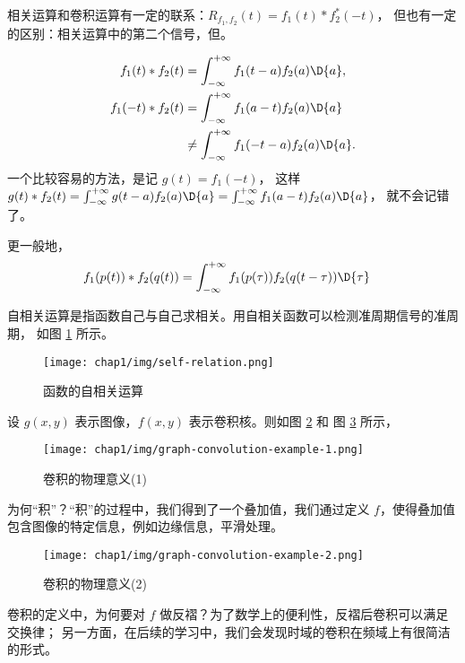 \begin{remark}
    相关运算和卷积运算有一定的联系：$R_{f_1, f_2}(t) = f_1(t) * f_2^*(-t)$，
    但也有一定的区别：相关运算中的第二个信号，但。
\end{remark}

\begin{note}
    \begin{align*}
        f_1(t) * f_2(t) & = \int_{-\infty}^{+\infty}f_1(t - a)f_2(a)\D{a}, \\
        f_1(-t) * f_2(t) & = \int_{-\infty}^{+\infty}f_1(a - t)f_2(a)\D{a} \\
        & \neq \int_{-\infty}^{+\infty}f_1(-t - a)f_2(a)\D{a}.
    \end{align*}
    一个比较容易的方法，是记 $g(t) = f_1(-t)$，
    这样 $g(t) * f_2(t) = \int_{-\infty}^{+\infty}g(t - a)f_2(a)\D{a} = \int_{-\infty}^{+\infty}f_1(a - t)f_2(a)\D{a}$，
    就不会记错了。

    更一般地，
    \begin{align*}
        f_1(p(t)) * f_2(q(t)) & = \int_{-\infty}^{+\infty}f_1(p(\tau))f_2(q(t-\tau))\D{\tau}
    \end{align*}
\end{note}

\begin{example}[自相关运算]
    自相关运算是指函数自己与自己求相关。用自相关函数可以检测准周期信号的准周期，
    如图 \ref{fig:self-relation} 所示。
    \begin{figure}[H]
        \centering
        \texttt{[image: chap1/img/self-relation.png]}
        \caption{函数的自相关运算}
        \label{fig:self-relation}
    \end{figure}
\end{example}

\begin{example}[卷积的物理意义]
    设 $g(x, y)$ 表示图像，$f(x, y)$ 表示卷积核。则如图 \ref{fig:graph-convolution-example-1} 和
    图 \ref{fig:graph-convolution-example-2} 所示，
    \begin{figure}[H]
        \centering
        \texttt{[image: chap1/img/graph-convolution-example-1.png]}
        \caption{卷积的物理意义(1)}
        \label{fig:graph-convolution-example-1}
    \end{figure}
    为何``积''？``积''的过程中，我们得到了一个叠加值，我们通过定义 $f$，使得叠加值包含图像的特定信息，例如边缘信息，平滑处理。
    \begin{figure}[H]
        \centering
        \texttt{[image: chap1/img/graph-convolution-example-2.png]}
        \caption{卷积的物理意义(2)}
        \label{fig:graph-convolution-example-2}
    \end{figure}
\end{example}

\begin{note}
    卷积的定义中，为何要对 $f$ 做反褶？为了数学上的便利性，反褶后卷积可以满足交换律；
    另一方面，在后续的学习中，我们会发现时域的卷积在频域上有很简洁的形式。
\end{note}
